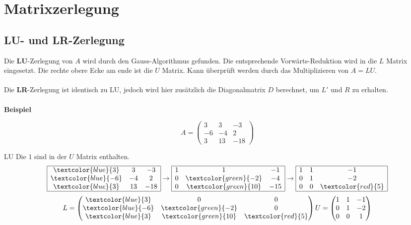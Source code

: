 \section{Matrixzerlegung}
\subsection{LU- und LR-Zerlegung}
Die \textbf{LU}-Zerlegung von $A$ wird durch den Gauss-Algorithmus gefunden. Die entsprechende Vorwärts-Reduktion wird in die $L$ Matrix eingesetzt. Die rechte obere Ecke am ende ist die $U$ Matrix. Kann überprüft werden durch das Multiplizieren von $A = LU$.
\\ \\
Die \textbf{LR}-Zerlegung ist identisch zu LU, jedoch wird hier zusätzlich die Diagonalmatrix $D$ berechnet, um $L'$ und $R$ zu erhalten.
\\ \\
\noindent\textbf{Beispiel}

\[
A = \begin{pmatrix}
	3 & 3 &-3 \\
	-6 & -4 & 2 \\
	3 & 13 & -18
\end{pmatrix}
\]

\noindent LU
{\tiny Die $1$ sind in der $U$ Matrix enthalten.}
\[
\begin{array}{|ccc|}
	\hline
	\textcolor{blue}{3} & 3 &-3 \\
	\textcolor{blue}{-6} & -4 & 2 \\
	\textcolor{blue}{3} & 13 & -18 \\ 
	\hline
\end{array}
\rightarrow
\begin{array}{|ccc|}
	\hline
	1 & 1 &-1 \\
	0 & \textcolor{green}{-2} & -4 \\
	0 &\textcolor{green}{10} & -15 \\
	\hline
\end{array}
\rightarrow
\begin{array}{|ccc|}
	\hline
	1 & 1 &-1 \\
	0 & 1 & -2 \\
	0 & 0 & \textcolor{red}{5}  \\
	\hline
\end{array}
\]
\[
L = \begin{pmatrix}
	\textcolor{blue}{3} & 0 &0 \\
	\textcolor{blue}{-6} & \textcolor{green}{-2} & 0 \\
	\textcolor{blue}{3} & \textcolor{green}{10} &  \textcolor{red}{5}
\end{pmatrix}
\\
U = \begin{pmatrix}
	1 & 1 & -1 \\
	0 & 1 & -2 \\
	0 & 0 & 1
\end{pmatrix}
\] 

